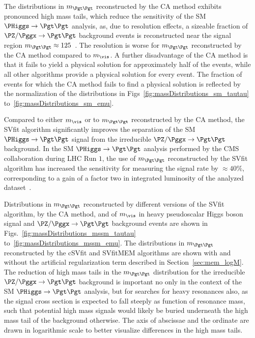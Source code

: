 The distributions in $m_{\Pgt\Pgt}$ reconstructed by the CA method
exhibits pronounced high mass tails, which reduce the sensitivity of the SM $\PHiggs \to \Pgt\Pgt$ analysis,
as, due to resolution effects, a sizeable fraction of $\PZ/\Pggx \to \Pgt\Pgt$ background events
is reconstructed near the signal region $m_{\Pgt\Pgt} \approx 125$~\GeV.
The resolution is worse for $m_{\Pgt\Pgt}$ reconstructed by the CA method compared to $m_{\vis}$.
A further disadvantage of the CA method is that it fails to yield a physical solution for approximately half of the events,
while all other algorithms provide a physical solution for every event.
The fraction of events for which the CA method fails to find a physical solution is reflected by the normalization of the distributions
in Figs~\ref{fig:massDistributions_sm_tautau} to~\ref{fig:massDistributions_sm_emu}.

Compared to either $m_{\vis}$ or to $m_{\Pgt\Pgt}$ reconstructed by the CA method,
the SVfit algorithm significantly improves the separation of the SM $\PHiggs \to \Pgt\Pgt$ signal
from the irreducible $\PZ/\Pggx \to \Pgt\Pgt$ background.
In the SM $\PHiggs \to \Pgt\Pgt$ analysis performed by the CMS collaboration during LHC Run $1$,
the use of $m_{\Pgt\Pgt}$ reconstructed by the SVfit algorithm
has increased the sensitivity for measuring the signal rate by $\approx 40\%$,
corresponding to a gain of a factor two in integrated luminosity of the analyzed dataset~\cite{HIG-13-004}.

Distributions in $m_{\Pgt\Pgt}$ reconstructed by different versions of
the SVfit algorithm, by the CA method, and of $m_{\vis}$ in heavy
pseudoscalar Higgs boson signal and $\PZ/\Pggx \to \Pgt\Pgt$
background events are shown in
Figs.~\ref{fig:massDistributions_mssm_tautau}
to~\ref{fig:massDistributions_mssm_emu}.
The distributions in $m_{\Pgt\Pgt}$ reconstructed by the cSVfit and
SVfitMEM algorithms are shown with and without the artificial regularization
term described in Section~\ref{sec:mem_logM}. 
The reduction of high mass tails in the $m_{\Pgt\Pgt}$ distribution
for the irreducible $\PZ/\Pggx \to \Pgt\Pgt$
background is important no only in the context of the SM $\PHiggs \to
\Pgt\Pgt$ analysis, but for searches for heavy resonances also, as the signal cross section is expected to fall steeply as function of resonance mass,
such that potential high mass signals would likely be buried underneath the high mass tail of the background otherwise.
The axis of abscissae and the ordinate are drawn in logarithmic scale to better visualize differences in the high mass tails.

